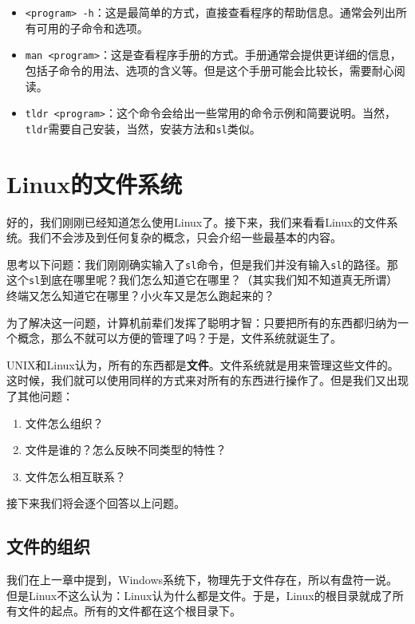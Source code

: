 \documentclass[../main.tex]{subfiles}
\begin{document}
\begin{itemize}
  \item \texttt{<program> -h}：这是最简单的方式，直接查看程序的帮助信息。通常会列出所有可用的子命令和选项。
  \item \texttt{man <program>}：这是查看程序手册的方式。手册通常会提供更详细的信息，包括子命令的用法、选项的含义等。但是这个手册可能会比较长，需要耐心阅读。
  \item \texttt{tldr <program>}：这个命令会给出一些常用的命令示例和简要说明。当然，\texttt{tldr}需要自己安装，当然，安装方法和\texttt{sl}类似。
\end{itemize}

\section{Linux的文件系统}

好的，我们刚刚已经知道怎么使用Linux了。接下来，我们来看看Linux的文件系统。我们不会涉及到任何复杂的概念，只会介绍一些最基本的内容。

思考以下问题：我们刚刚确实输入了\texttt{sl}命令，但是我们并没有输入\texttt{sl}的路径。那这个\texttt{sl}到底在哪里呢？我们怎么知道它在哪里？（其实我们知不知道真无所谓）终端又怎么知道它在哪里？小火车又是怎么跑起来的？

为了解决这一问题，计算机前辈们发挥了聪明才智：只要把所有的东西都归纳为一个概念，那么不就可以方便的管理了吗？于是，文件系统就诞生了。

UNIX和Linux认为，所有的东西都是\textbf{文件}。文件系统就是用来管理这些文件的。这时候，我们就可以使用同样的方式来对所有的东西进行操作了。但是我们又出现了其他问题：

\begin{enumerate}
  \item 文件怎么组织？
  \item 文件是谁的？怎么反映不同类型的特性？
  \item 文件怎么相互联系？
\end{enumerate}

接下来我们将会逐个回答以上问题。

\subsection{文件的组织}

我们在上一章中提到，Windows系统下，物理先于文件存在，所以有盘符一说。但是Linux不这么认为：Linux认为什么都是文件。于是，Linux的根目录\text{/}就成了所有文件的起点。所有的文件都在这个根目录下。
\end{document}
